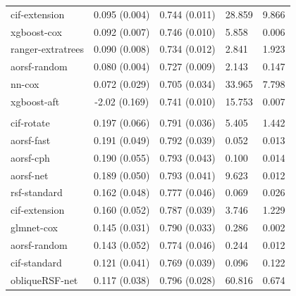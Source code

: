 \documentclass[twoside,11pt]{article}\usepackage[]{graphicx}\usepackage[]{xcolor}
\newenvironment{knitrout}{}{} %
\begin{document}
\begin{knitrout}
\begin{longtable}[t]{lcclc}
\hspace{1em}cif-extension & 0.095 (0.004) & 0.744 (0.011) & 28.859 & 9.866\\
\hspace{1em}xgboost-cox & 0.092 (0.007) & 0.746 (0.010) & 5.858 & 0.006\\
\hspace{1em}ranger-extratrees & 0.090 (0.008) & 0.734 (0.012) & 2.841 & 1.923\\
\hspace{1em}aorsf-random & 0.080 (0.004) & 0.727 (0.009) & 2.143 & 0.147\\
\hspace{1em}nn-cox & 0.072 (0.029) & 0.705 (0.034) & 33.965 & 7.798\\
\hspace{1em}xgboost-aft & -2.02 (0.169) & 0.741 (0.010) & 15.753 & 0.007\\
\addlinespace[0.3em]
\hline
\multicolumn{5}{l}{\textit{\textbf{VA lung cancer trial; death, n = 137, p = 8}}}\\
\hline
\hspace{1em}cif-rotate & 0.197 (0.066) & 0.791 (0.036) & 5.405 & 1.442\\
\hspace{1em}aorsf-fast & 0.191 (0.049) & 0.792 (0.039) & 0.052 & 0.013\\
\hspace{1em}aorsf-cph & 0.190 (0.055) & 0.793 (0.043) & 0.100 & 0.014\\
\hspace{1em}aorsf-net & 0.189 (0.050) & 0.793 (0.041) & 9.623 & 0.012\\
\hspace{1em}rsf-standard & 0.162 (0.048) & 0.777 (0.046) & 0.069 & 0.026\\
\hspace{1em}cif-extension & 0.160 (0.052) & 0.787 (0.039) & 3.746 & 1.229\\
\hspace{1em}glmnet-cox & 0.145 (0.031) & 0.790 (0.033) & 0.286 & 0.002\\
\hspace{1em}aorsf-random & 0.143 (0.052) & 0.774 (0.046) & 0.244 & 0.012\\
\hspace{1em}cif-standard & 0.121 (0.041) & 0.769 (0.039) & 0.096 & 0.122\\
\hspace{1em}obliqueRSF-net & 0.117 (0.038) & 0.796 (0.028) & 60.816 & 0.674\\

\end{longtable}
\end{knitrout}
\end{document}
